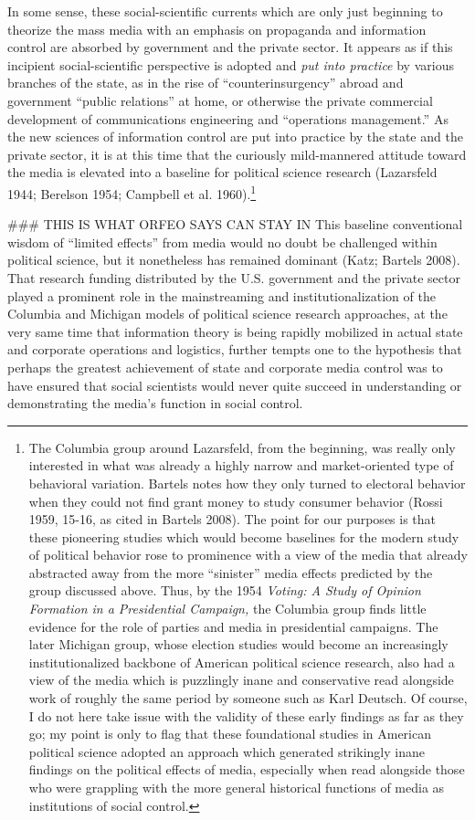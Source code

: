 In some sense, these social-scientific currents which are only just beginning to theorize the mass
media with an emphasis on propaganda and information control are absorbed by government and the
private sector. It appears as if this incipient social-scientific perspective is adopted and
\emph{put into practice} by various branches of the state, as in the rise of ``counterinsurgency''
abroad and government ``public relations'' at home, or otherwise the private commercial development
of communications engineering and ``operations management.'' As the new sciences of information
control are put into practice by the state and the private sector, it is at this time that the
curiously mild-mannered attitude toward the media is elevated into a baseline for political science
research (Lazarsfeld 1944; Berelson 1954; Campbell et al. 1960).\footnote{The Columbia group
around Lazarsfeld, from the beginning, was really only interested in what was already a highly
narrow and market-oriented type of behavioral variation. Bartels notes how they only turned to
electoral behavior when they could not find grant money to study consumer behavior (Rossi 1959,
15-16, as cited in Bartels 2008). The point for our purposes is that these pioneering studies which
would become baselines for the modern study of political behavior rose to prominence with a view of
the media that already abstracted away from the more ``sinister'' media effects predicted by the
group discussed above. Thus, by the 1954 \emph{Voting: A Study of Opinion Formation in a
Presidential Campaign, }the Columbia group finds little evidence for the role of parties and media
in presidential campaigns. The later Michigan group, whose election studies would become an
increasingly institutionalized backbone of American political science research, also had a view of
the media which is puzzlingly inane and conservative read alongside work of roughly the same period
by someone such as Karl Deutsch. Of course, I do not here take issue with the validity of these
early findings as far as they go; my point is only to flag that these foundational studies in
American political science adopted an approach which generated strikingly inane findings on the
political effects of media, especially when read alongside those who were grappling with the more
general historical functions of media as institutions of social control.} 

### THIS IS WHAT ORFEO SAYS CAN STAY IN
This baseline
conventional wisdom of ``limited effects'' from media would no doubt be challenged within political
science, but it nonetheless has remained dominant (Katz; Bartels 2008). That research funding
distributed by the U.S. government and the private sector played a prominent role in the
mainstreaming and institutionalization of the Columbia and Michigan models of political science
research approaches, at the very same time that information theory is being rapidly mobilized in
actual state and corporate operations and logistics, further tempts one to the hypothesis that
perhaps the greatest achievement of state and corporate media control was to have ensured that
social scientists would never quite succeed in understanding or demonstrating the media's function
in social control.

